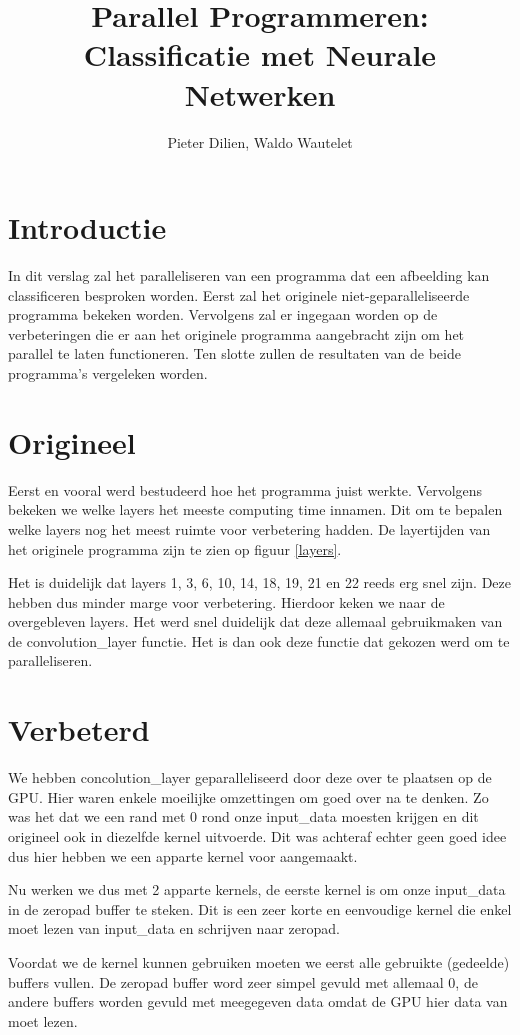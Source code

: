 \documentclass[a4paper, 12pt, one column]{article}
\title{Parallel Programmeren: Classificatie met Neurale Netwerken}
\author{Pieter Dilien, Waldo Wautelet}
\begin{document}
\maketitle

\section{Introductie}
In dit verslag zal het paralleliseren van een programma dat een afbeelding kan classificeren besproken worden.
Eerst zal het originele niet-geparalleliseerde programma bekeken worden. Vervolgens zal er ingegaan worden op 
de verbeteringen die er aan het originele programma aangebracht zijn om het parallel te laten functioneren. Ten slotte
zullen de resultaten van de beide programma's vergeleken worden.

\section{Origineel}
Eerst en vooral werd bestudeerd hoe het programma juist werkte. Vervolgens bekeken we welke layers het meeste computing time 
innamen. Dit om te bepalen welke layers nog het meest ruimte voor verbetering hadden. De layertijden van het originele programma
zijn te zien op figuur \ref{layers}.

\noindent
Het is duidelijk dat layers 1, 3, 6, 10, 14, 18, 19, 21 en 22 reeds erg snel zijn. Deze hebben dus minder marge voor verbetering.
Hierdoor keken we naar de overgebleven layers. Het werd snel duidelijk dat deze allemaal gebruikmaken van de convolution\_layer functie.
Het is dan ook deze functie dat gekozen werd om te paralleliseren.

\section{Verbeterd}
We hebben concolution_layer geparalleliseerd door deze over te plaatsen op de GPU. Hier waren enkele moeilijke omzettingen om goed 
over na te denken. Zo was het dat we een rand met 0 rond onze input_data moesten krijgen en dit origineel ook in diezelfde kernel 
uitvoerde. Dit was achteraf echter geen goed idee dus hier hebben we een apparte kernel voor aangemaakt.

\noindent
Nu werken we dus met 2 apparte kernels, de eerste kernel is om onze input_data in de zeropad buffer te steken. Dit is een zeer
korte en eenvoudige kernel die enkel moet lezen van input_data en schrijven naar zeropad.

\noindent
Voordat we de kernel kunnen gebruiken moeten we eerst alle gebruikte (gedeelde) buffers vullen. De zeropad buffer 
word zeer simpel gevuld met allemaal 0, de andere buffers worden gevuld met meegegeven data omdat de GPU hier data
van moet lezen.
\end{document}
